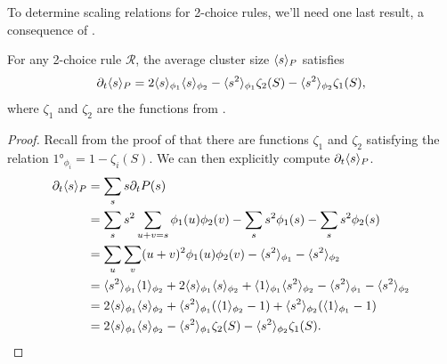 \documentclass[twoside,10pt]{article}
\begin{document}
To determine scaling relations for 2-choice rules, we'll need one last result, a consequence of .

\begin{cor}
	\label{2c-sdel-sp}
	For any 2-choice rule $\mathcal{R}$, the average cluster size $\langle s \rangle_{P}$ satisfies
\[
        \partial_{t}{\langle s \rangle_{P}} = 2\langle s \rangle_{\phi_1}\langle s \rangle_{\phi_2} - \langle s^2 \rangle_{\phi_1}\zeta_2(S) - \langle s^2 \rangle_{\phi_2}\zeta_1(S),
\]
where $\zeta_1$ and $\zeta_2$ are the functions from .
\end{cor}
\begin{proof}
	Recall from the proof of  that there are functions $\zeta_1$ and $\zeta_2$ satisfying the relation $\ang{1}_{\phi_i} = 1-\zeta_i(S)$. We can then explicitly compute $\partial_{t}{\langle s \rangle_{P}} $.
        \begin{align*}
                \partial_{t}{\langle s \rangle_{P}} &= \sum_s s \partial_{t}{P(s)} \\
                                    &= \sum_s s^2 \sum_{u+v=s}\phi_1(u)\phi_2(v) - \sum_s s^2 \phi_1(s) - \sum_s s^2 \phi_2(s) \\
                                    &= \sum_{u}\sum_{v} (u+v)^2\phi_1(u) \phi_2(v) - \langle s^2 \rangle_{\phi_1}-\langle s^2 \rangle_{\phi_2} \\
                                    &= \langle s^2 \rangle_{\phi_1}\langle 1 \rangle_{\phi_2} + 2\langle s \rangle_{\phi_1}\langle s \rangle_{\phi_2} + \langle 1 \rangle_{\phi_1}\langle s^2 \rangle_{\phi_2}- \langle s^2 \rangle_{\phi_1}-\langle s^2 \rangle_{\phi_2} \\
                                    &= 2\langle s \rangle_{\phi_1}\langle s \rangle_{\phi_2} + \langle s^2 \rangle_{\phi_1}(\langle 1 \rangle_{\phi_2} - 1) + \langle s^2 \rangle_{\phi_2}(\langle 1 \rangle_{\phi_1}-1) \\
                                    &= 2\langle s \rangle_{\phi_1}\langle s \rangle_{\phi_2} - \langle s^2 \rangle_{\phi_1}\zeta_2(S) - \langle s^2 \rangle_{\phi_2}\zeta_1(S).
        \end{align*}
\end{proof}
\end{document}
